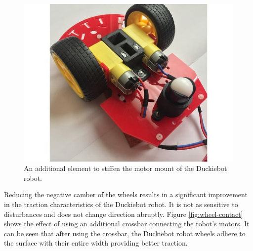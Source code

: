 \documentclass[conference]{IEEEtran}
\begin{document}
\begin{figure}[ht!]
    \centering
    \includegraphics[width=1.0\columnwidth]{img/duckie-th.jpeg}
    \caption{An additional element to stiffen the motor mount of the Duckiebot robot.}
    \label{fig:stiffening-element}
\end{figure}

Reducing the negative camber of the wheels results in a significant improvement in the traction characteristics of the Duckiebot robot. It is not as sensitive to disturbances and does not change direction abruptly. Figure \ref{fig:wheel-contact} shows the effect of using an additional crossbar connecting the robot's motors. It can be seen that after using the crossbar, the Duckiebot robot wheels adhere to the surface with their entire width providing better traction.
\end{document}
